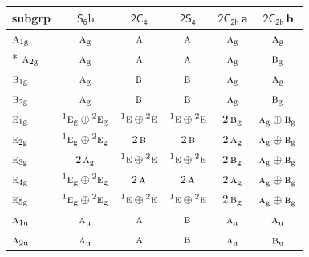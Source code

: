 \documentclass[10pt,a4paper]{article}
\numberwithin{equation}{section}
\newcommand{\grp}[1]{\mathsf{#1}}
\newcommand{\irr}[1]{\text{\normalfont\scshape #1}}
\newcommand{\conjpair}[1]{{}^{#1}}
\newcommand{\ptag}[1]{\mathrm{#1}}
\newcommand{\clsletter}[1]{\,{\scriptsize\color{black!55}#1}}
\newcommand{\secondclass}{\mathrm{b}}
\begin{document}
{\small\begin{longtable}{@{}lccccc@{}}\toprule
subgrp & \href{S6b.pdf}{$\grp{S_{6}}\secondclass$} & \href{2C4.pdf}{$\grp{2C_{4}}$} & \href{2S4.pdf}{$\grp{2S_{4}}$} & \href{2C2h.pdf}{$\grp{2C_{2h}}$}\clsletter{a} & \href{2C2h.pdf}{$\grp{2C_{2h}}$}\clsletter{b}\\\midrule\endhead
\bottomrule\endfoot\endlastfoot
$\irr{a}_{1\ptag{g}}$ & $\irr{a}_{\ptag{g}}$ & $\irr{a}$ & $\irr{a}$ & $\irr{a}_{\ptag{g}}$ & $\irr{a}_{\ptag{g}}$\\*
$\irr{a}_{2\ptag{g}}$ & $\irr{a}_{\ptag{g}}$ & $\irr{a}$ & $\irr{a}$ & $\irr{a}_{\ptag{g}}$ & $\irr{b}_{\ptag{g}}$\\
$\irr{b}_{1\ptag{g}}$ & $\irr{a}_{\ptag{g}}$ & $\irr{b}$ & $\irr{b}$ & $\irr{a}_{\ptag{g}}$ & $\irr{a}_{\ptag{g}}$\\
$\irr{b}_{2\ptag{g}}$ & $\irr{a}_{\ptag{g}}$ & $\irr{b}$ & $\irr{b}$ & $\irr{a}_{\ptag{g}}$ & $\irr{b}_{\ptag{g}}$\\
$\irr{e}_{1\ptag{g}}$ & $\conjpair{1}\irr{e}_{\ptag{g}}\oplus \conjpair{2}\irr{e}_{\ptag{g}}$ & $\conjpair{1}\irr{e}\oplus \conjpair{2}\irr{e}$ & $\conjpair{1}\irr{e}\oplus \conjpair{2}\irr{e}$ & $2\,\irr{b}_{\ptag{g}}$ & $\irr{a}_{\ptag{g}}\oplus \irr{b}_{\ptag{g}}$\\
$\irr{e}_{2\ptag{g}}$ & $\conjpair{1}\irr{e}_{\ptag{g}}\oplus \conjpair{2}\irr{e}_{\ptag{g}}$ & $2\,\irr{b}$ & $2\,\irr{b}$ & $2\,\irr{a}_{\ptag{g}}$ & $\irr{a}_{\ptag{g}}\oplus \irr{b}_{\ptag{g}}$\\
$\irr{e}_{3\ptag{g}}$ & $2\,\irr{a}_{\ptag{g}}$ & $\conjpair{1}\irr{e}\oplus \conjpair{2}\irr{e}$ & $\conjpair{1}\irr{e}\oplus \conjpair{2}\irr{e}$ & $2\,\irr{b}_{\ptag{g}}$ & $\irr{a}_{\ptag{g}}\oplus \irr{b}_{\ptag{g}}$\\
$\irr{e}_{4\ptag{g}}$ & $\conjpair{1}\irr{e}_{\ptag{g}}\oplus \conjpair{2}\irr{e}_{\ptag{g}}$ & $2\,\irr{a}$ & $2\,\irr{a}$ & $2\,\irr{a}_{\ptag{g}}$ & $\irr{a}_{\ptag{g}}\oplus \irr{b}_{\ptag{g}}$\\
$\irr{e}_{5\ptag{g}}$ & $\conjpair{1}\irr{e}_{\ptag{g}}\oplus \conjpair{2}\irr{e}_{\ptag{g}}$ & $\conjpair{1}\irr{e}\oplus \conjpair{2}\irr{e}$ & $\conjpair{1}\irr{e}\oplus \conjpair{2}\irr{e}$ & $2\,\irr{b}_{\ptag{g}}$ & $\irr{a}_{\ptag{g}}\oplus \irr{b}_{\ptag{g}}$\\
$\irr{a}_{1\ptag{u}}$ & $\irr{a}_{\ptag{u}}$ & $\irr{a}$ & $\irr{b}$ & $\irr{a}_{\ptag{u}}$ & $\irr{a}_{\ptag{u}}$\\
$\irr{a}_{2\ptag{u}}$ & $\irr{a}_{\ptag{u}}$ & $\irr{a}$ & $\irr{b}$ & $\irr{a}_{\ptag{u}}$ & $\irr{b}_{\ptag{u}}$\\

\end{longtable}}
\end{document}

